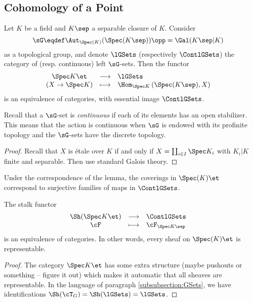 \subsection{Cohomology of a Point}

\begin{lem}
Let $K$ be a field and $K\sep$ a separable closure of $K$. Consider
$$
\sG \eqdef \Aut_{\Spec(K)}(\Spec(K\sep))\opp  = \Gal(K\sep | K)
$$
as a topological group, and denote $\lGSets$ (respectively $\ContlGSets$) the category of (resp. continuous) left $\sG$-sets. Then the functor
$$
\begin{array}{ccl}
\Spec K \et &  \longrightarrow & \lGSets \\
(X\to\Spec K) & \longmapsto & \Hom_{\Spec K}\left(\Spec(K\sep), X\right)
\end{array}
$$
is an equivalence of categories, with essential image $\ContlGSets$.
\end{lem}

Recall that a $\sG$-set is \emph{continuous} if each of its elements has an open stabilizer. This means that the action is continuous when $\sG$ is endowed with its profinite topology and the $\sG$-sets have the discrete topology.

\begin{proof}
Recall that $X$ is \'etale over $K$ if and only if  $X=\coprod_{i\in I} \Spec K_i$ with $K_i | K$ finite and separable. Then use standard Galois theory.
\end{proof}

\begin{remark}
Under the correspondence of the lemma, the coverings in $\Spec(K)\et$ correspond to surjective families of maps in $\ContlGSets$. 
\end{remark}

\begin{lem} \label{lem:EqOfCatContGSets}
The stalk functor
$$
\begin{array}{ccl}
\Sh(\Spec K\et) & \longrightarrow & \ContlGSets \\
\cF & \longmapsto & \cF_{\Spec K\sep}
\end{array}
$$
is an equivalence of categories. In other words, every sheaf on $\Spec(K)\et$ is representable.
\end{lem}

\begin{proof}
The category $\Spec K\et$ has some extra structure (maybe pushouts or something -- figure it out) which makes it automatic that all sheaves are representable. In the language of paragraph \ref{subsubsection:GSets}, we have identifications $\Sh(\cT_G) = \Sh(\lGSets) = \lGSets$.
\end{proof}

